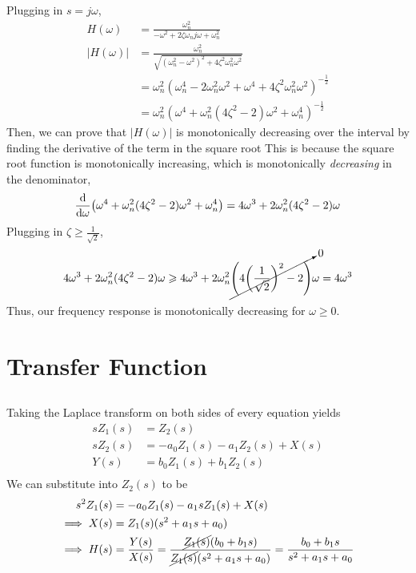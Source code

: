 \documentclass{article}
\begin{document}
Plugging in \(s = j \omega\),
\begin{align}
    H(\omega) &= \frac{\omega_n^2}{-\omega^2 + 2 \zeta \omega_n j \omega + \omega_n^2} \\
    |H(\omega)| &= \frac{\omega_n^2}{\sqrt{(\omega_n^2 - \omega^2)^2 + 4 \zeta^2 \omega_n^2 \omega^2}} \\
    &= \omega_n^2 (\omega_n^4 - 2\omega_n^2 \omega^2 + \omega^4 + 4 \zeta^2 \omega_n^2 \omega^2)^{-\frac{1}{2}} \\
    &= \omega_n^2 (\omega^4 + \omega_n^2 (4 \zeta^2 - 2) \omega^2 + \omega_n^4)^{-\frac{1}{2}}
\end{align}
Then, we can prove that \(|H(\omega)|\) is monotonically decreasing over the interval by finding the derivative of the term in the square root
This is because the square root function is monotonically increasing, which is monotonically \emph{decreasing} in the denominator,
\begin{equation}
    \dv{\omega} (\omega^4 + \omega_n^2 (4 \zeta^2 - 2) \omega^2 + \omega_n^4) = 4\omega^3 + 2\omega_n^2 (4\zeta^2 - 2) \omega
\end{equation}
Plugging in \(\zeta \geqslant \frac{1}{\sqrt{2}}\),
\begin{equation}
    4\omega^3 + 2\omega_n^2 (4\zeta^2 - 2) \omega \geqslant 4\omega^3 + 2\omega_n^2 \cancelto{0}{\qty(4 \qty(\frac{1}{\sqrt{2}})^2 - 2)} \omega = 4\omega^3
\end{equation}
Thus, our frequency response is monotonically decreasing for \(\omega \geqslant 0\).

\section{Transfer Function}

\subsection{}

Taking the Laplace transform on both sides of every equation yields
\begin{align}
    s Z_1(s) &= Z_2(s) \\
    s Z_2(s) &= -a_0 Z_1(s) - a_1 Z_2(s) + X(s) \\
    Y(s) &= b_0 Z_1(s) + b_1 Z_2(s) \\
\end{align}
We can substitute into \(Z_2(s)\) to be
\begin{align}
    s^2 Z_1(s) &= -a_0 Z_1(s) - a_1 s Z_1(s) + X(s) \\
    \implies X(s) &= Z_1(s) (s^2 + a_1 s + a_0) \\
    \implies H(s) &= \frac{Y(s)}{X(s)} = \frac{\cancel{Z_1(s)} (b_0 + b_1 s)}{\cancel{Z_1(s)} (s^2 + a_1 s + a_0)} = \frac{b_0 + b_1 s}{s^2 + a_1 s + a_0}
\end{align}
\end{document}
